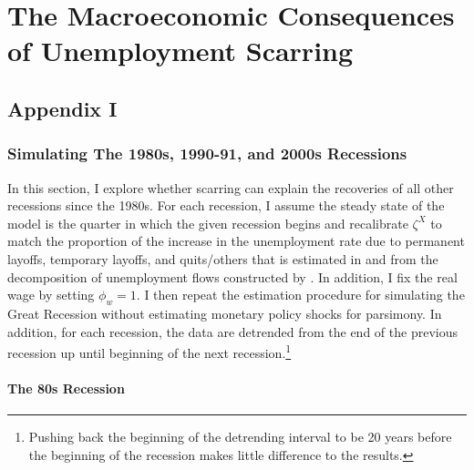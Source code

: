 \footnotesize
\renewcommand{\thechapter}{\Roman{chapter}}

\renewcommand{\thesection}{\Alph{section}}

\chapter{The Macroeconomic Consequences of Unemployment Scarring}


\pagebreak 


\section{Appendix I}

\subsection{Simulating The 1980s, 1990-91, and 2000s Recessions}

In this section, I explore whether scarring can explain the recoveries of all other recessions since the 1980s. For each recession, I assume the steady state of the model is the quarter in which the given recession begins and recalibrate $\zeta^{X}$ to match the proportion of the increase in the unemployment rate due to permanent layoffs, temporary layoffs, and quits/others that is estimated in \cite{Gertler2022} and from the decomposition of unemployment flows constructed by \cite{Fujita2017}. In addition, I fix the real wage by setting $\phi_{w} =1$.  I then repeat the estimation procedure for simulating the Great Recession without estimating monetary policy shocks for parsimony. In addition, for each recession, the data are detrended from the end of the previous recession up until beginning of the next recession.\footnote{ Pushing back the beginning of the detrending interval to be 20 years before the beginning of the recession makes little difference to the results. }

\subsubsection{The 80s Recession}

